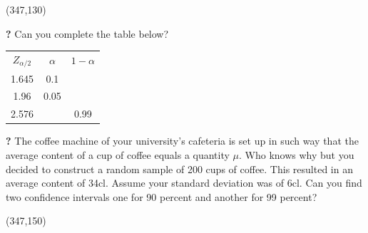\framebox(347,130){}

\forceindent \textbf{?} Can you complete the table below?

\begin{table}[H]
	\centering
	\begin{large}
	\begin{tabular}{ccc}
		\underline{$Z_{\alpha/2}$} & \underline{$\alpha$} & \underline{$1-\alpha$} \\
		1.645          & 0.1          &           \\
		1.96          & 0.05          &           \\
		2.576         &          & 0.99        
	\end{tabular}
	\end{large}
\end{table}

\forceindent \textbf{?} The coffee machine of your university's cafeteria is set up in such way that the average content of a cup of coffee equals a quantity $\mu$. Who knows why but you decided to construct a random sample of 200 cups of coffee. This resulted in an average content of 34cl. Assume your standard deviation was of 6cl. Can you find two confidence intervals one for 90 percent and another for 99 percent?

\framebox(347,150){}
